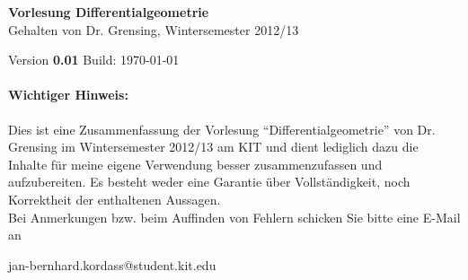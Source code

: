 \documentclass[a4paper, twoside, 11pt]{scrartcl}
\theoremstyle{plain}
\theoremstyle{definition}
\theoremstyle{remark}
\theoremstyle{plain}
\theoremstyle{definition}
\theoremstyle{remark}
\numberwithin{thmglobal}{section}
\numberwithin{thmglobal}{subsection}
\newcommand{\CmHeadline}[4][]{
  \begin{minipage}[t]{\textwidth}
    \huge{\textbf{#2}}\\
    \large{#3, #4}\relax
    \ifthenelse{\isempty{#1}}{}{\relax\large{, #1}}
  \end{minipage}
}
\begin{document}
\CmHeadline{Vorlesung Differentialgeometrie}{Gehalten von Dr. Grensing}{Wintersemester 2012/13}

\vspace{0.5cm}

Version \textbf{0.01} \quad Build: \today

\paragraph{Wichtiger Hinweis:}
Dies ist eine Zusammenfassung der Vorlesung "`Differentialgeometrie"' von Dr. Grensing im Wintersemester 2012/13 am KIT und dient lediglich dazu die Inhalte für meine eigene Verwendung besser zusammenzufassen und aufzubereiten. Es besteht weder eine Garantie über Vollständigkeit, noch Korrektheit der enthaltenen Aussagen.\\

Bei Anmerkungen bzw. beim Auffinden von Fehlern schicken Sie bitte eine E-Mail an
\begin{center}
  jan-bernhard.kordass@student.kit.edu
\end{center}







\appendix



\printindex


\printglossaries

\end{document}
